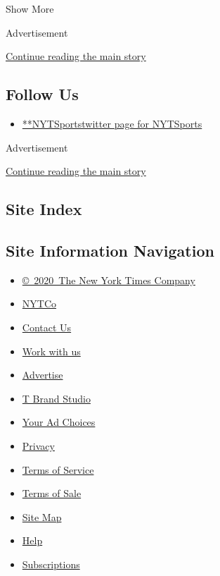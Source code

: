 Show More

Advertisement

\protect\hyperlink{after-mid1}{Continue reading the main story}

\hypertarget{follow-us}{%
\subsection{Follow Us}\label{follow-us}}

\begin{itemize}
\tightlist
\item
  \href{https://twitter.com/NYTSports}{**NYTSportstwitter page for
  NYTSports}
\end{itemize}

Advertisement

\protect\hyperlink{after-mktg}{Continue reading the main story}

\hypertarget{site-index}{%
\subsection{Site Index}\label{site-index}}

\hypertarget{site-information-navigation}{%
\subsection{Site Information
Navigation}\label{site-information-navigation}}

\begin{itemize}
\tightlist
\item
  \href{https://help.nytimes.com/hc/en-us/articles/115014792127-Copyright-notice}{©~2020~The
  New York Times Company}
\end{itemize}

\begin{itemize}
\tightlist
\item
  \href{https://www.nytco.com/}{NYTCo}
\item
  \href{https://help.nytimes.com/hc/en-us/articles/115015385887-Contact-Us}{Contact
  Us}
\item
  \href{https://www.nytco.com/careers/}{Work with us}
\item
  \href{https://nytmediakit.com/}{Advertise}
\item
  \href{http://www.tbrandstudio.com/}{T Brand Studio}
\item
  \href{https://www.nytimes.com/privacy/cookie-policy\#how-do-i-manage-trackers}{Your
  Ad Choices}
\item
  \href{https://www.nytimes.com/privacy}{Privacy}
\item
  \href{https://help.nytimes.com/hc/en-us/articles/115014893428-Terms-of-service}{Terms
  of Service}
\item
  \href{https://help.nytimes.com/hc/en-us/articles/115014893968-Terms-of-sale}{Terms
  of Sale}
\item
  \href{https://spiderbites.nytimes.com}{Site Map}
\item
  \href{https://help.nytimes.com/hc/en-us}{Help}
\item
  \href{https://www.nytimes.com/subscription?campaignId=37WXW}{Subscriptions}
\end{itemize}
